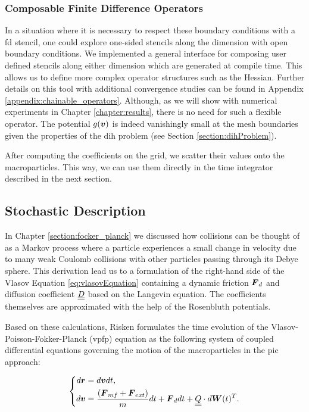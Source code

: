 \subsubsection{Composable Finite Difference Operators}

In a situation where it is necessary to respect these boundary conditions with a \gls{fd}
stencil, one could explore one-sided stencils along the dimension with open boundary conditions.
We implemented a general interface for composing user defined stencils along either dimension
which are generated at compile time.
This allows us to define more complex operator structures such as the Hessian.
Further details on this tool with additional convergence studies can be found in Appendix 
\ref{appendix:chainable_operators}.
Although, as we will show with numerical experiments in Chapter \ref{chapter:results}, there is no
need for such a flexible operator.
The potential $g(\boldsymbol{v})$ is indeed vanishingly small at the mesh boundaries given the properties of
the \gls{dih} problem (see Section \ref{section:dihProblem}).

After computing the coefficients on the grid, we scatter their values onto the macroparticles. This
way, we can use them directly in the time integrator described in the next section.

\subsection{Stochastic Description}
\label{sub:stochastic_description}

In Chapter \ref{section:focker_planck} we discussed how collisions can be thought of as a
Markov process where a particle experiences a small change in velocity due to many weak 
Coulomb collisions with other particles passing through its Debye sphere.
This derivation lead us to a formulation of the right-hand side of the Vlasov Equation
\ref{eq:vlasovEquation} containing a dynamic friction $\boldsymbol{F}_d$ and diffusion coefficient $\underline{\underline{D}}$ based on the Langevin equation.
The coefficients themselves are approximated with the help of the Rosenbluth potentials.

Based on these calculations, Risken \cite{Risken1984FokkerPlanckE} formulates the time evolution of
the Vlasov-Poisson-Fokker-Planck (\gls{vpfp}) equation as the following system of coupled differential equations
governing the motion of the macroparticles in the \gls{pic} approach:

\begin{equation}
\label{eq:SDE_system}
\left\{  
\begin{aligned}
    d\boldsymbol{r} &= d\boldsymbol{v} dt, \\
    d \boldsymbol{v} &=  \frac{(\boldsymbol{F}_{mf} +\boldsymbol{F}_{ext})}{m} dt + \boldsymbol{F}_d dt + \underline{\underline{Q}} \cdot d\boldsymbol{W}(t)^T.
\end{aligned}
\right.
\end{equation}


